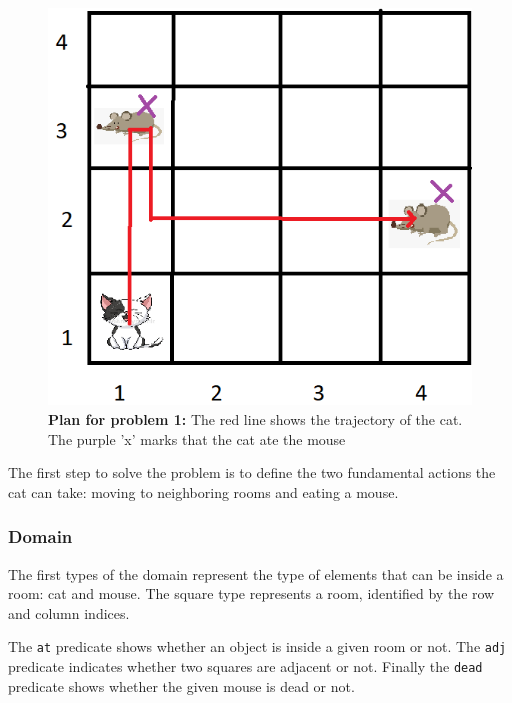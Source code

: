 \begin{multicols}{2}
\begin{figure}[H]
    \centering
    \includegraphics[width=\linewidth]{fig/A3/cat_01_sol.png}
    \caption{\textbf{Plan for problem 1:} The red line shows the trajectory of the cat. The purple 'x' marks that the cat ate the mouse}
    \label{fig:cat_01_sol}
\end{figure}

\end{multicols}

The first step to solve the problem is to define the two fundamental actions the cat can take: moving to neighboring rooms and eating a mouse.


\subsubsection{Domain}

The first types of the domain represent the type of elements that can be inside a room: cat and mouse. The square type represents a room, identified by the row and column indices.

The \verb|at| predicate shows whether an object is inside a given room or not. The \verb|adj| predicate indicates whether two squares are adjacent or not. Finally the \verb|dead| predicate shows whether the given mouse is dead or not.




